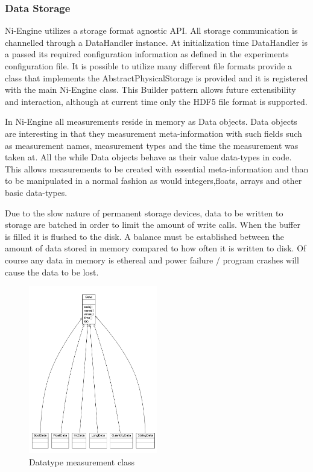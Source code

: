 \subsubsection{Data Storage}
Ni-Engine utilizes a storage format agnostic API. All storage communication is channelled through a DataHandler instance. At initialization time DataHandler is a passed its required configuration information as defined in the experiments configuration file. It is possible to utilize many different file formats provide a class that implements the AbstractPhysicalStorage is provided and it is registered with the main Ni-Engine class. This Builder pattern allows future extensibility and interaction, although at current time only the HDF5 file format is supported. 

In Ni-Engine all measurements reside in memory as Data objects. Data objects are interesting in that they measurement meta-information with such fields such as measurement names, measurement types and the time the measurement was taken at. All the while Data objects behave as their value data-types in code. This allows measurements to be created with essential meta-information and than to be manipulated in a normal fashion as would integers,floats, arrays and other basic data-types. 

Due to the slow nature of permanent storage devices, data to be written to storage are batched in order to limit the amount of write calls. When the buffer is filled it is flushed to the disk. A balance must be established between the amount of data stored in memory compared to how often it is written to disk. Of course any data in memory is ethereal and power failure / program crashes will cause the data to be lost. 
\begin{figure}[ht!]
\centering
\includegraphics[width=0.5\textwidth]{Figures/datatypes.png}
\caption{Datatype measurement class}
\label{fig:datatypes}
\end{figure}

